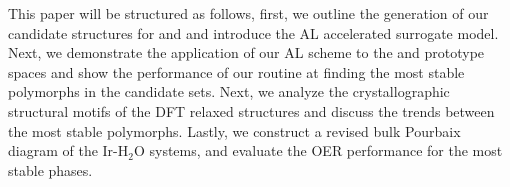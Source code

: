 %
This paper will be structured as follows,
first, we outline the generation of our candidate structures for \IrOtwo and \IrOthree and introduce the AL accelerated surrogate model.
%
Next, we demonstrate the application of our AL scheme to the \IrOtwo and \IrOthree prototype spaces and show the performance of our routine at finding the most stable polymorphs in the candidate sets.
%
Next, we analyze the crystallographic structural motifs of the DFT relaxed structures and discuss the trends between the most stable polymorphs.
%
Lastly, we construct a revised bulk Pourbaix diagram of the Ir-H$_2$O systems, and evaluate the OER performance for the most stable phases.
%
